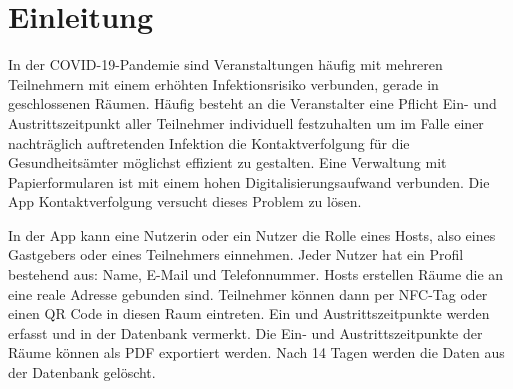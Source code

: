 \sloppy
\section{Einleitung}
\label{sec:Einleitung}
In der COVID-19-Pandemie sind Veranstaltungen häufig mit mehreren Teilnehmern mit einem erhöhten Infektionsrisiko verbunden, gerade in geschlossenen Räumen.
Häufig besteht an die Veranstalter eine Pflicht Ein- und Austrittszeitpunkt aller Teilnehmer individuell festzuhalten um im Falle einer nachträglich auftretenden Infektion die Kontaktverfolgung für die Gesundheitsämter möglichst effizient zu gestalten.
Eine Verwaltung mit Papierformularen ist mit einem hohen Digitalisierungsaufwand verbunden.
Die App Kontaktverfolgung versucht dieses Problem zu lösen.

In der App kann eine Nutzerin oder ein Nutzer die Rolle eines Hosts, also eines Gastgebers oder eines Teilnehmers einnehmen. Jeder Nutzer hat ein Profil bestehend aus: Name, E-Mail und Telefonnummer.
Hosts erstellen Räume die an eine reale Adresse gebunden sind. Teilnehmer können dann per NFC-Tag oder einen QR Code in diesen Raum eintreten. Ein und Austrittszeitpunkte werden erfasst und in der Datenbank vermerkt.
Die Ein- und Austrittszeitpunkte der Räume können als PDF exportiert werden.
Nach 14 Tagen werden die Daten aus der Datenbank gelöscht.
